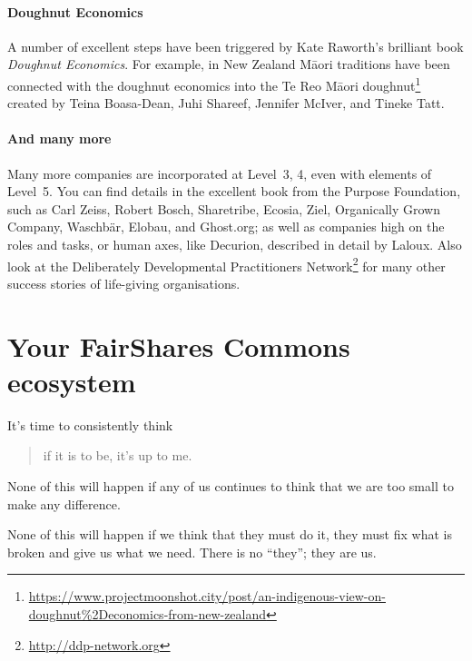 \paragraph{Doughnut Economics}  A number of excellent steps have been triggered by Kate Raworth’s  brilliant book \emph{Doughnut Economics}\cite{raworth-doughnut}. For example, in New Zealand M\=aori traditions have been connected with the doughnut economics into the Te Reo M\=aori doughnut\footnote{\url{https://www.projectmoonshot.city/post/an-indigenous-view-on-doughnut\%2Deconomics-from-new-zealand}} created by Teina Boasa-Dean,  Juhi Shareef,   Jennifer McIver,  and Tineke Tatt.


\paragraph{And many more} Many more companies are incorporated at Level~3, 4, even with elements of Level~5. You can find details in the excellent book from the Purpose Foundation\cite{purpose-foundation}, such as Carl Zeiss, Robert Bosch, Sharetribe, Ecosia, Ziel, Organically Grown Company, Waschb{\"a}r, Elobau, and Ghost.org; as well as companies high on the roles and tasks, or human axes, like Decurion, described in detail by Laloux\cite{laloux-RO}. Also look at the Deliberately Developmental Practitioners Network\footnote{\url{http://ddp-network.org}} for many other success stories of life-giving organisations.


\section{Your FairShares Commons ecosystem}
\label{section:create-join-ecosystem}


It's time to consistently think \begin{quote} if it is to be, it's up to me. \end{quote}


None of this will happen if any of us continues to think that we are too small to make any difference. 


None of this will happen if we think that they must do it, they must fix what is broken and give us what we need. There is no “they”; they are us.


